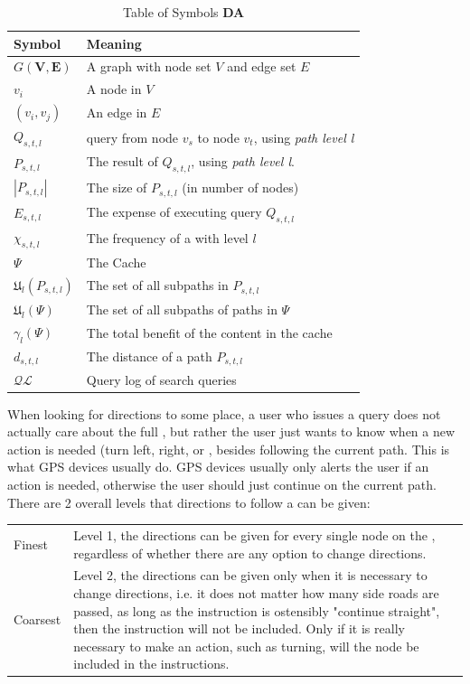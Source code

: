 \begin{table}
\begin{tabular*}{\columnwidth}{|l|p{}|}
\hline
\bf Symbol		& \bf Meaning \\\hline
$G\mathbf{(V,E)}$ 	& A graph with node set $V$ and edge set $E$ \\\hline 
$v_i$			& A node in $V$ \\\hline 
$(v_i,v_j)$		& An edge in $E$ \\\hline 

$Q_{s,t,l}$		& \spath query from node $v_s$ to node $v_t$, using \textit{path level l}\\\hline
$P_{s,t,l}$		& The \spath result of $Q_{s,t,l}$, using \textit{path level l}. \\\hline
$|P_{s,t,l}|$		& The size of $P_{s,t,l}$ (in number of nodes) \\\hline
$E_{s,t,l}$		& The expense of executing query $Q_{s,t,l}$ \\\hline
$\chi_{s,t,l}$		& The frequency of a \spath with level $l$ \\\hline
$\Psi$ 			& The Cache \\\hline
$\mathfrak{U}_l(P_{s,t,l})$& The set of all subpaths in $P_{s,t,l}$ \\\hline
$\mathfrak{U}_l(\Psi)$	& The set of all subpaths of paths in $\Psi$ \\\hline
$\gamma_l(\Psi)$		& The total benefit of the content in the cache \\\hline

$d_{s,t,l}$		& The \spath distance of a path $P_{s,t,l}$ \\\hline

$\mathcal{QL}$		& Query log of search queries \\\hline
\end{tabular*}
\caption{Table of Symbols \textbf{DA}}
\label{tab:symbols}
\end{table}

When looking for directions to some place, a user who issues a \spath query does not actually care about the full \spathns\cite{sigmodTaoSP11}, but rather the user just wants to know when a new action is needed (turn left, right, or , besides following the current path. This is what GPS devices usually do. GPS devices usually only alerts the user if an action is needed, otherwise the user should just continue on the current path.
There are 2 overall levels that directions to follow a \spath can be given:

\begin{tabular}{@{}lp{21em} }
Finest 		& Level 1, the directions can be given for every single node on the \spathns, regardless of whether there are any option to change directions. \\
Coarsest	& Level 2, the directions can be given only when it is necessary to change directions, i.e. it does not matter how many side roads are passed, as long as the instruction is ostensibly "continue straight", then the instruction will not be included. Only if it is really necessary to make an action, such as turning, will the node be included in the instructions.
\end{tabular}

